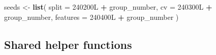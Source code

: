 \documentclass[
  11pt,
]{article}
\newenvironment{Shaded}{\begin{snugshade}}{\end{snugshade}}
\newcommand{\AttributeTok}[1]{\textcolor[rgb]{0.13,0.29,0.53}{#1}}
\newcommand{\DataTypeTok}[1]{\textcolor[rgb]{0.13,0.29,0.53}{#1}}
\newcommand{\DecValTok}[1]{\textcolor[rgb]{0.00,0.00,0.81}{#1}}
\newcommand{\FunctionTok}[1]{\textcolor[rgb]{0.13,0.29,0.53}{\textbf{#1}}}
\newcommand{\NormalTok}[1]{#1}
\newcommand{\OtherTok}[1]{\textcolor[rgb]{0.56,0.35,0.01}{#1}}
\newcommand{\SpecialCharTok}[1]{\textcolor[rgb]{0.81,0.36,0.00}{\textbf{#1}}}
\begin{document}
\begin{Shaded}
\begin{Highlighting}[]
\NormalTok{seeds }\OtherTok{\textless{}{-}} \FunctionTok{list}\NormalTok{(}
  \AttributeTok{split =} \DecValTok{240200}\DataTypeTok{L} \SpecialCharTok{+}\NormalTok{ group\_number,}
  \AttributeTok{cv =} \DecValTok{240300}\DataTypeTok{L} \SpecialCharTok{+}\NormalTok{ group\_number,}
  \AttributeTok{features =} \DecValTok{240400}\DataTypeTok{L} \SpecialCharTok{+}\NormalTok{ group\_number}
\NormalTok{)}
\end{Highlighting}
\end{Shaded}

\subsection*{Shared helper functions}\label{shared-helper-functions}
\end{document}
